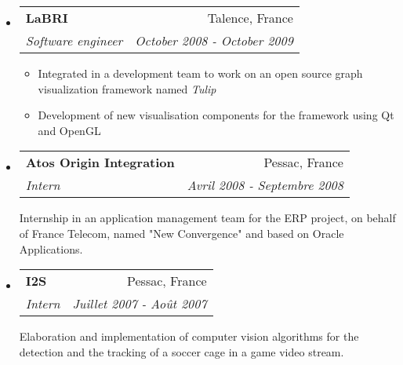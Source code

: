\documentclass[letterpaper,11pt]{article}
\makeatletter
\newcommand{\resitem}[1]{\item #1 \vspace{-2pt}}
\newcommand{\ressubheading}[4]{
\begin{tabular*}{6.5in}{l@{\cftdotfill{\cftsecdotsep}\extracolsep{\fill}}r}
    \textbf{#1} & #2 \\
    \textit{#3} & \textit{#4} \\
\end{tabular*}\vspace{-6pt}}
\makeatother
\begin{document}
\begin{itemize}
  \item
    \ressubheading{LaBRI}{Talence, France}{Software engineer}{October 2008 - October 2009}
    \begin{itemize}
      \resitem{Integrated in a development team to work on an open source graph visualization framework named \emph{Tulip}}
      \resitem{Development of new visualisation components for the framework using Qt and OpenGL}
    \end{itemize}

  \item
    \ressubheading{Atos Origin Integration}{Pessac, France}{Intern}{Avril 2008 - Septembre 2008}

    Internship in an application management team for the ERP project, on behalf of France Telecom, named "New Convergence" and based on 
    Oracle Applications.
    

  \item
    \ressubheading{I2S}{Pessac, France}{Intern}{Juillet 2007 - Août 2007}

    Elaboration and implementation of computer vision algorithms for the detection and the tracking of a soccer cage in a game video stream.

\end{itemize}
\end{document}
